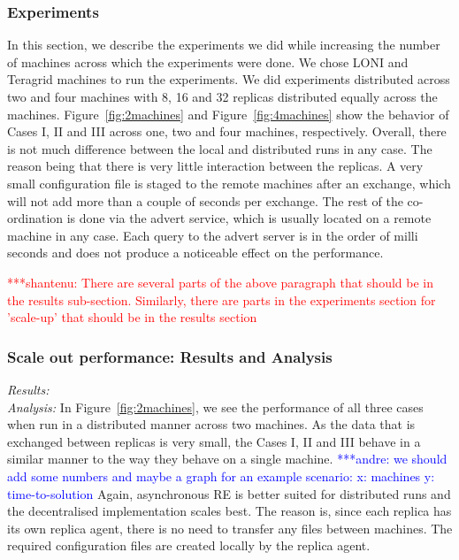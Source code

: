 \documentclass{rspublic}
\newcommand{\jhanote}[1]{ {\textcolor{red} { ***shantenu: #1 }}}
\newcommand{\alnote}[1]{ {\textcolor{blue} { ***andre: #1 }}}
\newcommand{\alnote}[1]{}
\newcommand{\jhanote}[1]{}
\begin{document}
\subsubsection{Experiments}
In this section, we describe the experiments we did while increasing
the number of machines across which the experiments were done. We
chose LONI and Teragrid machines to run the experiments. We did
experiments distributed across two and four machines with 8, 16 and 32
replicas distributed equally across the machines.
Figure~\ref{fig:2machines} and Figure~\ref{fig:4machines} show the
behavior of Cases I, II and III across one, two and four machines,
respectively. Overall, there is not much difference between the local
and distributed runs in any case. The reason being that there is very
little interaction between the replicas. A very small configuration
file is staged to the remote machines after an exchange, which will
not add more than a couple of seconds per exchange. The rest of the
co-ordination is done via the advert service, which is usually located
on a remote machine in any case. Each query to the advert server is in
the order of milli seconds and does not produce a noticeable effect on
the performance.

\jhanote{There are several parts of the above paragraph that should be
  in the results sub-section. Similarly, there are parts in the
  experiments section for 'scale-up' that should be in the results
  section}

\subsubsection{Scale out performance: Results and Analysis}

{\it Results:}\\


{\it Analysis: } In Figure~\ref{fig:2machines}, we see the performance of all three cases when run in a distributed manner across two machines. As the data that is exchanged between replicas is very small, the Cases I, II and III behave in a similar manner to the way they behave on a single machine. \alnote{we should add some numbers and maybe a graph for an example scenario: x: machines y: time-to-solution} Again, asynchronous RE is better suited for distributed runs and the decentralised implementation scales best. The reason is, since each replica has its own replica agent, there is no need to transfer any files between machines. The required configuration files are created locally by the replica agent.
\end{document}
